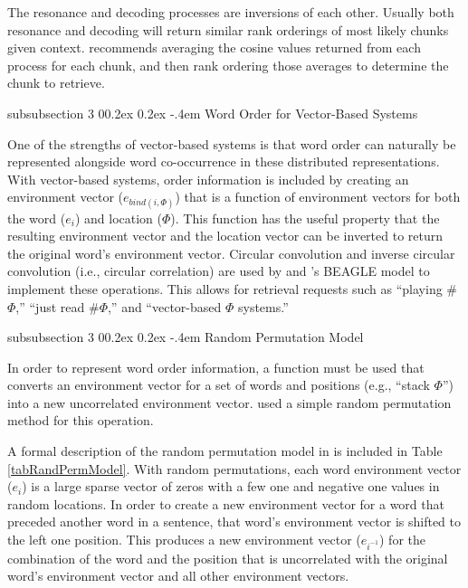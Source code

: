 \documentclass[man,floatsintext,donotrepeattitle]{apa6}
\makeatletter
\renewcommand{\subsubsection}{%
  \@startsection
  {subsubsection}%
  {3}%
  {\parindent}%
  {0\baselineskip \@plus 0.2ex \@minus 0.2ex}%
  {-.4em}%
  {\normalfont\normalsize\bfseries\addperi}}
\makeatother
\begin{document}
The resonance and decoding processes are inversions of each other.
Usually both resonance and decoding will return similar rank orderings of most likely chunks given context.
\textcite{Jones2007} recommends averaging the cosine values returned from each process for each chunk, and then rank ordering those averages to determine the chunk to retrieve.

\subsubsection{Word Order for Vector-Based Systems}

One of the strengths of vector-based systems is that word order can naturally be represented alongside word co-occurrence in these distributed representations.
With vector-based systems, order information is included by creating an environment vector ($e_{bind(i,\Phi)}$) that is a function of environment vectors for both the word ($e_{i}$) and location ($\Phi$).
This function has the useful property that the resulting environment vector and the location vector can be inverted to return the original word's environment vector.
Circular convolution and inverse circular convolution (i.e., circular correlation) are used by \textcite{Plate1995} and \textcite{Jones2007}'s BEAGLE model to implement these operations.
This allows for retrieval requests such as ``playing \#$\Phi$,'' ``just read \#$\Phi$,'' and ``vector-based $\Phi$ systems.''

\subsubsection{Random Permutation Model}

In order to represent word order information, a function must be used that converts an environment vector for a set of words and positions (e.g., ``stack $\Phi$'') into a new uncorrelated environment vector.
\textcite{Sahlgren2008} used a simple random permutation method for this operation.

A formal description of the random permutation model in \textcite{Sahlgren2008} is included in Table \ref{tabRandPermModel}.
With random permutations, each word environment vector ($e_{i}$) is a large sparse vector of zeros with a few one and negative one values in random locations. 
In order to create a new environment vector for a word that preceded another word in a sentence, that word's environment vector is shifted to the left one position.
This produces a new environment vector ($e_{i^{-1}}$) for the combination of the word and the position that is uncorrelated with the original word's environment vector and all other environment vectors.
\end{document}
